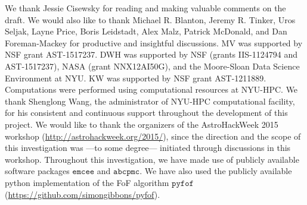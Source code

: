\documentclass[fleqn,usenatbib]{mnras}
\begin{document}
We thank Jessie Cisewsky for reading and making valuable comments on the draft. We would also like to thank Michael R. Blanton, Jeremy R. Tinker, Uros Seljak, Layne Price, 
Boris Leidstadt, Alex Malz, Patrick McDonald, and Dan Foreman-Mackey for productive 
and insightful discussions. MV was supported by NSF grant AST-1517237. DWH was supported 
by NSF (grants IIS-1124794 and AST-1517237), NASA (grant NNX12AI50G), and the Moore-Sloan 
Data Science Environment at NYU. KW was supported by NSF grant AST-1211889. Computations 
were performed using computational resources at NYU-HPC. We thank Shenglong Wang, the 
administrator of NYU-HPC computational facility, for his consistent and continuous support 
throughout the development of this project. We would like to thank the organizers of 
the AstroHackWeek 2015 workshop (\url{http://astrohackweek.org/2015/}), 
since the direction and the scope of this investigation was ---to some degree--- initiated 
through discussions in this workshop. Throughout this investigation, we have made use of 
publicly available software packages $\mathtt{emcee}$ and $\mathtt{abcpmc}$. We have also used the publicly available python implementation of the FoF algorithm $\mathtt{pyfof}$ (\url{https://github.com/simongibbons/pyfof}).


\end{document}
